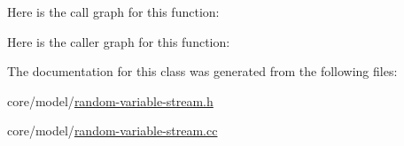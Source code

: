 Here is the call graph for this function\+:




Here is the caller graph for this function\+:




The documentation for this class was generated from the following files\+:\begin{DoxyCompactItemize}
\item 
core/model/\hyperlink{random-variable-stream_8h}{random-\/variable-\/stream.\+h}\item 
core/model/\hyperlink{random-variable-stream_8cc}{random-\/variable-\/stream.\+cc}\end{DoxyCompactItemize}
